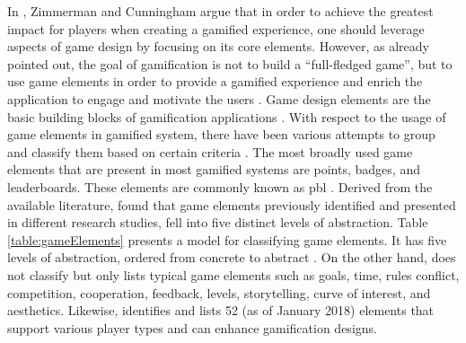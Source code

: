 In \cite{zichermann2011gamification}, Zimmerman and Cunningham argue that in order to achieve the greatest impact for players when creating a gamified experience, one should leverage aspects of game design by focusing on its core elements. However, as already pointed out, the goal of gamification is not to build a ``full-fledged game'', but to use game elements in order to provide a gamified experience and enrich the application to engage and motivate the users \cite{deterding2011game, werbach2012win}. Game design elements are the basic building blocks of gamification applications \cite{deterding2011game, werbach2012win}. With respect to the usage of game elements in gamified system, there have been various attempts to group and classify them based on certain criteria \cite{deterding2011game, werbach2012win, kapp2012gamification, zichermann2011gamification}. The most broadly used game elements that are present in most gamified systems are points, badges, and leaderboards. These elements are commonly known as \acrshort{pbl} \cite{werbach2012win}. Derived from the available literature, \cite{deterding2011game} found that game elements previously identified and presented in different research studies, fell into five distinct levels of abstraction. Table \ref{table:gameElements} presents a model for classifying game elements. It has five levels of abstraction, ordered from concrete to abstract \cite{deterding2011game}. On the other hand, \cite{kapp2012gamification} does not classify but only lists typical game elements such as goals, time, rules  conflict, competition, cooperation, feedback, levels,  storytelling, curve of interest, and aesthetics. Likewise, \cite{50GamElements} identifies and lists 52 (as of January 2018) elements that support various player types and can enhance gamification designs.\\\\
